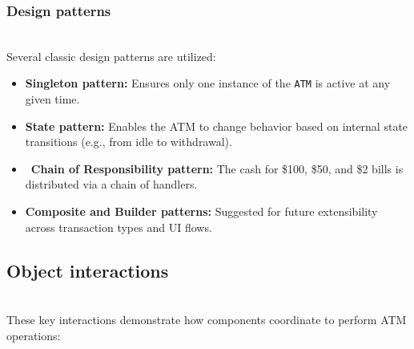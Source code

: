 \subsubsection{Design patterns}\label{7lO_sr2_e10506munsuOC}
\\
Several classic design patterns are utilized:

\begin{itemize}
\item
\protect{}\label{AHTNY8c4qBKs2Mgs4PK6n}
\textbf{Singleton pattern:} Ensures only one instance of the \texttt{ATM} is active at any given time.
\item
\protect{}\label{DDmbYW-PYnmYEbVlhAL3A}
\textbf{State pattern:} Enables the ATM to change behavior based on internal state transitions (e.g., from idle to withdrawal).
\item
\protect{}\label{MWd-NqRWFB5TSaPU1-K_x}
~\textbf{Chain of Responsibility pattern:} The cash for \$100, \$50, and \$2 bills is distributed via a chain of handlers.
\item
\protect{}\label{KIi0jKGzpwwa8-Afdfs-t}
\textbf{Composite and Builder patterns:} Suggested for future extensibility across transaction types and UI flows.
\end{itemize}

\subsection{Object interactions}\label{WD_uWTU6UhzjCfZpdp6RM}
\\
These key interactions demonstrate how components coordinate to perform ATM operations:

